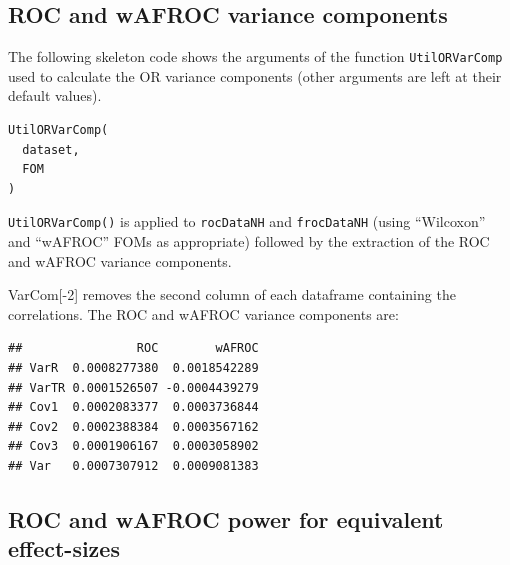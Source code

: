 \documentclass[
]{book}
\newenvironment{Shaded}{\begin{snugshade}}{\end{snugshade}}
\newcommand{\AttributeTok}[1]{\textcolor[rgb]{0.77,0.63,0.00}{#1}}
\newcommand{\DecValTok}[1]{\textcolor[rgb]{0.00,0.00,0.81}{#1}}
\newcommand{\FunctionTok}[1]{\textcolor[rgb]{0.00,0.00,0.00}{#1}}
\newcommand{\NormalTok}[1]{#1}
\newcommand{\OtherTok}[1]{\textcolor[rgb]{0.56,0.35,0.01}{#1}}
\newcommand{\SpecialCharTok}[1]{\textcolor[rgb]{0.00,0.00,0.00}{#1}}
\newcommand{\StringTok}[1]{\textcolor[rgb]{0.31,0.60,0.02}{#1}}
\begin{document}
\hypertarget{roc-and-wafroc-variance-components}{%
\subsection{ROC and wAFROC variance components}\label{roc-and-wafroc-variance-components}}

The following skeleton code shows the arguments of the function \texttt{UtilORVarComp} used to calculate the OR variance components (other arguments are left at their default values).

\begin{verbatim}
UtilORVarComp(
  dataset,
  FOM
)
\end{verbatim}

\texttt{UtilORVarComp()} is applied to \texttt{rocDataNH} and \texttt{frocDataNH} (using ``Wilcoxon'' and ``wAFROC'' FOMs as appropriate) followed by the extraction of the ROC and wAFROC variance components.

\begin{Shaded}
\end{Shaded}

VarCom{[}-2{]} removes the second column of each dataframe containing the correlations. The ROC and wAFROC variance components are:

\begin{verbatim}
##                ROC        wAFROC
## VarR  0.0008277380  0.0018542289
## VarTR 0.0001526507 -0.0004439279
## Cov1  0.0002083377  0.0003736844
## Cov2  0.0002388384  0.0003567162
## Cov3  0.0001906167  0.0003058902
## Var   0.0007307912  0.0009081383
\end{verbatim}

\hypertarget{roc-and-wafroc-power-for-equivalent-effect-sizes}{%
\subsection{ROC and wAFROC power for equivalent effect-sizes}\label{roc-and-wafroc-power-for-equivalent-effect-sizes}}
\end{document}
